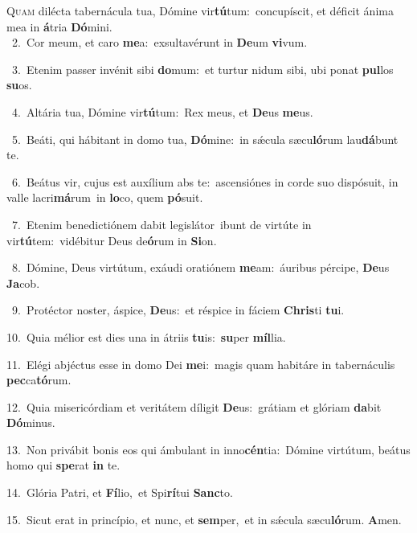 \lettrine{\initial\textcolor{\initialcolor}{Q}}{uam} dilécta tabernácula tua, Dómine vir\-\textbf{tú}\-tum:~\star concupíscit, et déficit ánima mea in \textbf{á}\-tria \textbf{Dó}\-mini.\\
{\numbfont\textcolor{\numbcolor}{~2.}}~Cor meum, et caro \textbf{me}\-a:~\star exsultavérunt in \textbf{De}\-um \textbf{vi}\-vum.\par
{\numbfont\textcolor{\numbcolor}{~3.}}~Etenim passer invénit sibi \textbf{do}\-mum:~\star et turtur nidum sibi, ubi ponat \textbf{pul}\-los \textbf{su}\-os.\par
{\numbfont\textcolor{\numbcolor}{~4.}}~Altária tua, Dómine vir\-\textbf{tú}\-tum:~\star Rex meus, et \textbf{De}\-us \textbf{me}\-us.\par
{\numbfont\textcolor{\numbcolor}{~5.}}~Beáti, qui hábitant in domo tua, \textbf{Dó}\-mine:~\star in sǽcula sæcu\-\textbf{ló}\-rum lau\-\textbf{dá}\-bunt te.\par
{\numbfont\textcolor{\numbcolor}{~6.}}~Beátus vir, cujus est auxílium abs te:~\dagger ascensiónes in corde suo dispósuit, in valle lacri\-\textbf{má}\-rum~\star in \textbf{lo}\-co, quem \textbf{pó}\-suit.\par
{\numbfont\textcolor{\numbcolor}{~7.}}~Etenim benedictiónem dabit legislátor~\dagger ibunt de virtúte in vir\-\textbf{tú}\-tem:~\star vidébitur Deus de\-\textbf{ó}\-rum in \textbf{Si}\-on.\par
{\numbfont\textcolor{\numbcolor}{~8.}}~Dómine, Deus virtútum, exáudi oratiónem \textbf{me}\-am:~\star áuribus pércipe, \textbf{De}\-us \textbf{Ja}\-cob.\par
{\numbfont\textcolor{\numbcolor}{~9.}}~Protéctor noster, áspice, \textbf{De}\-us:~\star et réspice in fáciem \textbf{Chris}\-ti \textbf{tu}\-i.\par
{\numbfont\textcolor{\numbcolor}{10.}}~Quia mélior est dies una in átriis \textbf{tu}\-is:~\star \textbf{su}\-per \textbf{míl}\-lia.\par
{\numbfont\textcolor{\numbcolor}{11.}}~Elégi abjéctus esse in domo Dei \textbf{me}\-i:~\star magis quam habitáre in tabernáculis \textbf{pec}\-ca\-\textbf{tó}\-rum.\par
{\numbfont\textcolor{\numbcolor}{12.}}~Quia misericórdiam et veritátem díligit \textbf{De}\-us:~\star grátiam et glóriam \textbf{da}\-bit \textbf{Dó}\-minus.\par
{\numbfont\textcolor{\numbcolor}{13.}}~Non privábit bonis eos qui ámbulant in inno\-\textbf{cén}\-tia:~\star Dómine virtútum, beátus homo qui \textbf{spe}\-rat \textbf{in} te.\par
{\numbfont\textcolor{\numbcolor}{14.}}~Glória Patri, et \textbf{Fí}\-lio,~\star et Spi\-\textbf{rí}\-tui \textbf{Sanc}\-to.\par
{\numbfont\textcolor{\numbcolor}{15.}}~Sicut erat in princípio, et nunc, et \textbf{sem}\-per,~\star et in sǽcula sæcu\-\textbf{ló}\-rum. \textbf{A}\-men.\par
